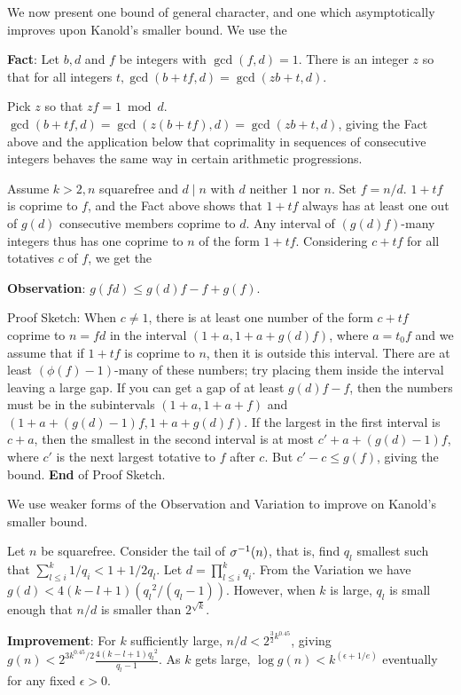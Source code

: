 \documentclass[12pt,leqno]{article}
\begin{document}
We now present one bound of general character, and one which asymptotically
improves upon Kanold's smaller bound.  We use the  

\textbf{Fact}: Let $b, d$ and $f$ be integers with $\gcd(f,d)=1$.  
There is an integer $z$ so that for all integers 
$t, \gcd(b + tf, d) = \gcd(zb + t, d)$.

Pick $z$ so that $zf=1 \bmod{d}$. $\gcd(b + tf, d) = \gcd(z(b + tf), d) = \gcd(zb + t, d)$,
giving the Fact above and the application below that coprimality
in sequences of consecutive integers behaves the same way in
certain arithmetic progressions. 

Assume $k \gt 2, n$ squarefree and $d \mid n$ with
$d$ neither $1$ nor $n$.  Set $f=n/d$.  $1+tf$ is coprime to $f$, and
the Fact above shows that $1+tf$ always has at least one
out of $g(d)$ consecutive members coprime to $d$.  Any interval of $(g(d)f)$-many
integers thus has one coprime to $n$ of the form $1+tf$. 
Considering $c+tf$ for all totatives $c$ of $f$, we get the

\textbf{Observation}: $g(fd) \leq g(d)f - f + g(f).$

Proof Sketch: When $c \neq 1$, 
there is at least one number of the form $c+tf$ coprime to
$n=fd$ in the interval $(1+a, 1+a + g(d)f)$, where $a=t_0f$ and we
assume that if $1+tf$ is coprime to $n$, then it is outside this interval.
There are at least $(\phi(f) - 1)$-many of these numbers; try placing them
inside the interval leaving a large gap.  If you can get a gap
of at least $g(d)f - f$, then the numbers must be 
in the subintervals $(1+a, 1+a+f)$ and 
$(1+a+(g(d)-1)f, 1+a+g(d)f)$.  If the largest in the first
interval is $c+a$, then the smallest in the second interval is
at most $c'+a+(g(d)-1)f$, where $c'$ is the next largest totative
to $f$ after $c$.  But $c' - c \leq g(f)$, giving the bound.
\textbf{End} of Proof Sketch.

We use weaker forms of the Observation and Variation to improve on
Kanold's smaller bound.

Let $n$ be squarefree.  Consider the tail of ${\sigma}^{-1}(n)$,
that is, find $q_l$ smallest such that 
$\sum_{l \leq i}^k 1/q_i \lt 1 + 1/2q_l$.  Let
$d = \prod_{l \leq i}^k q_i$.  From the Variation we have 
$g(d) \lt 4(k-l+1)({q_l}^2/(q_l - 1))$.  However, when $k$ is large, 
$q_l$ is small enough that $n/d$ is smaller 
than $2^{\sqrt{k}}$.

\textbf{Improvement}:  For $k$ sufficiently large,
$n/d \lt 2^{\frac{3}{2}k^{0.45}}$, giving
$g(n) \lt 2^{3k^{0.45}/2}\frac{4(k-l+1){q_l}^2}{q_l-1}$.
As $k$ gets large, $\log g(n) \lt k^{(\epsilon +1/e)}$ 
eventually for any fixed $\epsilon \gt 0$.
\end{document}
